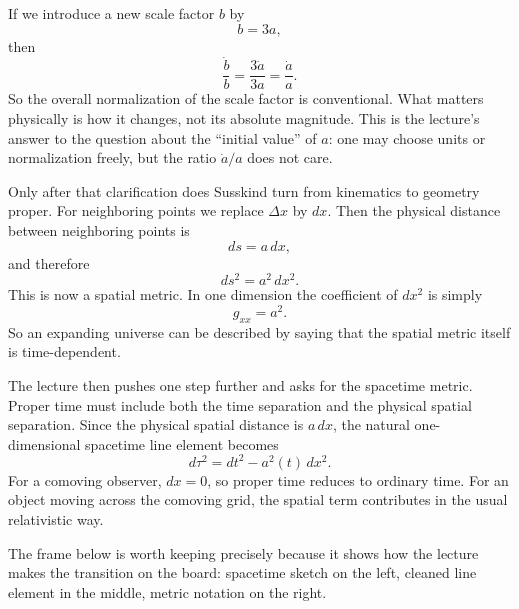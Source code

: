 If we introduce a new scale factor \(b\) by
\begin{equation}
b=3a,
\end{equation}
then
\begin{equation}
\frac{\dot b}{b}=\frac{3\dot a}{3a}=\frac{\dot a}{a}.
\end{equation}
So the overall normalization of the scale factor is conventional. What matters physically is how it changes, not its absolute magnitude. This is the lecture's answer to the question about the ``initial value'' of \(a\): one may choose units or normalization freely, but the ratio \(\dot a/a\) does not care.

Only after that clarification does Susskind turn from kinematics to geometry proper. For neighboring points we replace \(\Delta x\) by \(dx\). Then the physical distance between neighboring points is
\begin{equation}
ds=a\,dx,
\end{equation}
and therefore
\begin{equation}
ds^2=a^2\,dx^2.
\end{equation}
This is now a spatial metric. In one dimension the coefficient of \(dx^2\) is simply
\begin{equation}
g_{xx}=a^2.
\end{equation}
So an expanding universe can be described by saying that the spatial metric itself is time-dependent.

The lecture then pushes one step further and asks for the spacetime metric. Proper time must include both the time separation and the physical spatial separation. Since the physical spatial distance is \(a\,dx\), the natural one-dimensional spacetime line element becomes
\begin{equation}
d\tau^2=dt^2-a^2(t)\,dx^2.
\end{equation}
For a comoving observer, \(dx=0\), so proper time reduces to ordinary time. For an object moving across the comoving grid, the spatial term contributes in the usual relativistic way.

The frame below is worth keeping precisely because it shows how the lecture makes the transition on the board: spacetime sketch on the left, cleaned line element in the middle, metric notation on the right.

